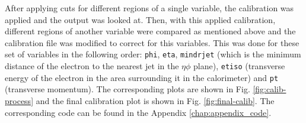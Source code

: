 \documentclass[a4paper]{report}
\numberwithin{equation}{section}
\begin{document}
After applying cuts for different regions of a single variable, the calibration was applied and the output was looked at. Then, with this applied calibration, different regions of another variable were compared as mentioned above and the calibration file was modified to correct for this variables. This was done for these set of variables in the following order: \texttt{phi}, \texttt{eta}, \texttt{mindrjet} (which is the minimum distance of the electron to the nearest jet in the $\eta \phi$ plane), \texttt{etiso} (transverse energy of the electron in the area surrounding it in the calorimeter) and \texttt{pt} (transverse momentum). The corresponding plots are shown in Fig. \ref{fig:calib-process} and the final calibration plot is shown in Fig. \ref{fig:final-calib}. The corresponding code can be found in the Appendix \ref{chap:appendix_code}. 
\begin{figure}[htb!]
	\centering
	\quad
	\centering
	\quad
	\centering

\end{figure}
\end{document}
